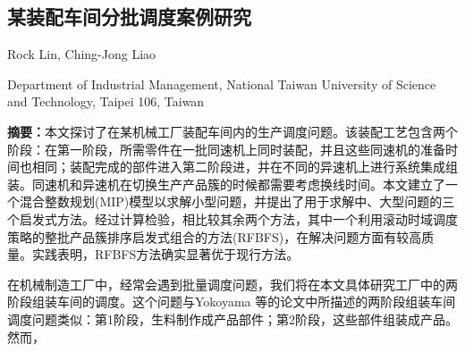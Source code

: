 \begin{Abstract}
\chapter*{某装配车间分批调度案例研究}
\begin{center}
\vspace{2mm}
{
 {\xiaosi Rock Lin, Ching-Jong Liao}

 {\xiaowu Department of Industrial Management, National Taiwan University of Science and Technology, Taipei 106, Taiwan}
}
\end{center}
{\wuhao \songti 
\noindent \textbf{摘要：}本文探讨了在某机械工厂装配车间内的生产调度问题。该装配工艺包含两个阶段：在第一阶段，所需零件在一批同速机上同时装配，并且这些同速机的准备时间也相同；装配完成的部件进入第二阶段进，并在不同的异速机上进行系统集成组装。同速机和异速机在切换生产产品簇的时候都需要考虑换线时间。本文建立了一个混合整数规划(MIP)模型以求解小型问题，并提出了用于求解中、大型问题的三个启发式方法。经过计算检验，相比较其余两个方法，其中一个利用滚动时域调度策略的整批产品簇排序启发式组合的方法(RFBFS)，在解决问题方面有较高质量。实践表明，RFBFS方法确实显著优于现行方法。

}
\end{Abstract}

在机械制造工厂中，经常会遇到批量调度问题，我们将在本文具体研究工厂中的两阶段组装车间的调度。这个问题与Yokoyama 等的论文中所描述的两阶段组装车间调度问题类似：第1阶段，生料制作成产品部件；第2阶段，这些部件组装成产品。然而，



